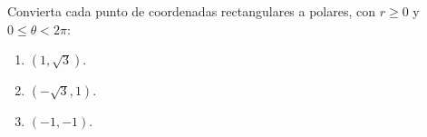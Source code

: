 Convierta cada punto de coordenadas rectangulares a polares, con $r\geq 0$ y $0\leq\theta<2\pi$:
\begin{enumerate}
    \item $(1,\sqrt{3})$.
    \item $(-\sqrt{3},1)$.
    \item $(-1,-1)$.
\end{enumerate}

